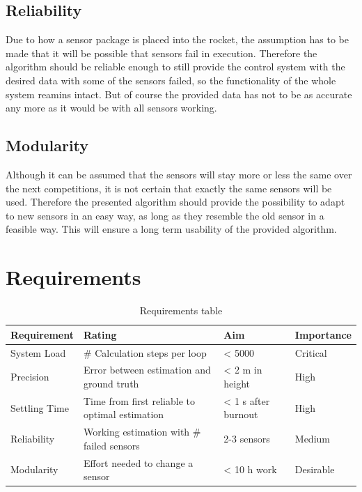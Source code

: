  \subsection{Reliability}
 Due to how a sensor package is placed into the rocket, the assumption has to be made that it will be possible that sensors fail in execution.
 Therefore the algorithm should be reliable enough to still provide the control system with the desired data with some of the sensors failed, so the functionality of the whole system reamins intact. But of course the provided data has not to be as accurate any more as it would be with all sensors working.

 \subsection{Modularity}
 Although it can be assumed that the sensors will stay more or less the same over the next competitions, it is not certain that exactly the same sensors will be used.
 Therefore the presented algorithm should provide the possibility to adapt to new sensors in an easy way, as long as they resemble the old sensor in a feasible way.
 This will ensure a long term usability of the provided algorithm.

 \section{Requirements}

 \begin{table}[h]
 \centering
 \begin{tabular}{|l|l|l|l|}
 \hline
 \bf{Requirement}   & \bf{Rating} & \bf{Aim} & \bf{Importance} \\ \hline
 System Load   & \# Calculation steps per loop & < 5000 & Critical \\ \hline
 Precision     & Error between estimation and ground truth  & < 2 m in height & High  \\ \hline
 Settling Time & Time from first reliable to optimal estimation  & < 1 s after burnout &  High \\ \hline
 Reliability   & Working estimation with \# failed sensors & 2-3 sensors & Medium \\ \hline
 Modularity    & Effort needed to change a sensor & < 10 h work &  Desirable \\ \hline
 \end{tabular}
 \caption{Requirements table}
 \label{tab:Requirements}
 \end{table}

